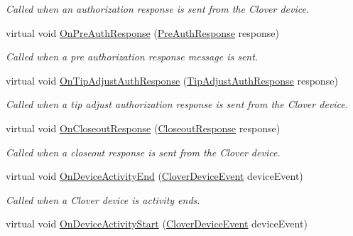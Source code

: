 \begin{DoxyCompactItemize}
\begin{DoxyCompactList}\small\item\em Called when an authorization response is sent from the Clover device. \end{DoxyCompactList}\item 
virtual void \hyperlink{classcom_1_1clover_1_1remotepay_1_1sdk_1_1_default_clover_connector_listener_a780336c5a5388a0dc223e59f527e2f1d}{On\+Pre\+Auth\+Response} (\hyperlink{classcom_1_1clover_1_1remotepay_1_1sdk_1_1_pre_auth_response}{Pre\+Auth\+Response} response)
\begin{DoxyCompactList}\small\item\em Called when a pre authorization response message is sent. \end{DoxyCompactList}\item 
virtual void \hyperlink{classcom_1_1clover_1_1remotepay_1_1sdk_1_1_default_clover_connector_listener_ab81030d438c6c75eb2a2b8ee3fd6f51f}{On\+Tip\+Adjust\+Auth\+Response} (\hyperlink{classcom_1_1clover_1_1remotepay_1_1sdk_1_1_tip_adjust_auth_response}{Tip\+Adjust\+Auth\+Response} response)
\begin{DoxyCompactList}\small\item\em Called when a tip adjust authorization response is sent from the Clover device. \end{DoxyCompactList}\item 
virtual void \hyperlink{classcom_1_1clover_1_1remotepay_1_1sdk_1_1_default_clover_connector_listener_ae5a9a85a4807b9823869577a1d58d953}{On\+Closeout\+Response} (\hyperlink{classcom_1_1clover_1_1remotepay_1_1sdk_1_1_closeout_response}{Closeout\+Response} response)
\begin{DoxyCompactList}\small\item\em Called when a closeout response is sent from the Clover device. \end{DoxyCompactList}\item 
virtual void \hyperlink{classcom_1_1clover_1_1remotepay_1_1sdk_1_1_default_clover_connector_listener_a3f72c953ad6dafe916936e23a5d38cd5}{On\+Device\+Activity\+End} (\hyperlink{classcom_1_1clover_1_1remotepay_1_1sdk_1_1_clover_device_event}{Clover\+Device\+Event} device\+Event)
\begin{DoxyCompactList}\small\item\em Called when a Clover device is activity ends. \end{DoxyCompactList}\item 
virtual void \hyperlink{classcom_1_1clover_1_1remotepay_1_1sdk_1_1_default_clover_connector_listener_aec99f93d834adb5f8fb2ff1837391b5e}{On\+Device\+Activity\+Start} (\hyperlink{classcom_1_1clover_1_1remotepay_1_1sdk_1_1_clover_device_event}{Clover\+Device\+Event} device\+Event)

\end{DoxyCompactItemize}
